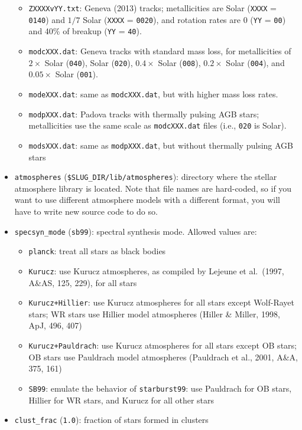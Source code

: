 \documentclass[12pt]{article}
\begin{document}
\begin{itemize}
\begin{itemize}
\item \verb=ZXXXXvYY.txt=: Geneva (2013) tracks; metallicities are Solar (\verb=XXXX= = \verb=0140=) and $1/7$ Solar (\verb=XXXX= = \verb=0020=), and rotation rates are 0 (\verb=YY= = \verb=00=) and 40\% of breakup (\verb=YY= = \verb=40=).
\item \verb=modcXXX.dat=: Geneva tracks with standard mass loss, for metallicities of $2\times$ Solar (\verb=040=), Solar (\verb=020=), $0.4\times$ Solar (\verb=008=), $0.2\times$ Solar (\verb=004=), and $0.05\times$ Solar (\verb=001=).
\item \verb=modeXXX.dat=: same as \verb=modcXXX.dat=, but with higher mass loss rates.
\item \verb=modpXXX.dat=: Padova tracks with thermally pulsing AGB stars; metallicities use the same scale as \verb=modcXXX.dat= files (i.e., \verb=020= is Solar).
\item \verb=modsXXX.dat=: same as \verb=modpXXX.dat=, but without thermally pulsing AGB stars
\end{itemize}
\item \verb=atmospheres= (\verb=$SLUG_DIR/lib/atmospheres=): directory where the stellar atmosphere library is located. Note that file names are hard-coded, so if you want to use different atmosphere models with a different format, you will have to write new source code to do so.
\item \verb=specsyn_mode= (\verb=sb99=): spectral synthesis mode. Allowed values are:
\begin{itemize}
\item \verb=planck=: treat all stars as black bodies
\item \verb=Kurucz=: use Kurucz atmospheres, as compiled by Lejeune et al.~(1997, A\&AS, 125, 229), for all stars
\item \verb=Kurucz+Hillier=: use Kurucz atmospheres for all stars except Wolf-Rayet stars; WR stars use Hillier model atmospheres (Hiller \& Miller, 1998, ApJ, 496, 407)
\item \verb=Kurucz+Pauldrach=: use Kurucz atmospheres for all stars except OB stars; OB stars use Pauldrach model atmospheres (Pauldrach et al., 2001, A\&A, 375, 161)
\item \verb=SB99=: emulate the behavior of \verb=starburst99=: use Pauldrach for OB stars, Hillier for WR stars, and Kurucz for all other stars
\end{itemize}
\item \verb=clust_frac= (\verb=1.0=): fraction of stars formed in clusters

\end{itemize}
\end{document}
